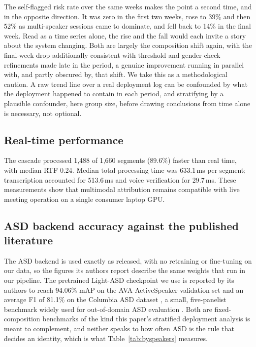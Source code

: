 \documentclass[conference]{IEEEtran}
\begin{document}
The self-flagged risk rate over the same weeks makes the point a
second time, and in the opposite direction. It was zero in the first
two weeks, rose to 39\% and then 52\% as multi-speaker sessions came to
dominate, and fell back to 14\% in the final week. Read as a time
series alone, the rise and the fall would each invite a story about the
system changing. Both are largely the composition shift again, with the
final-week drop additionally consistent with threshold and gender-check
refinements made late in the period, a genuine improvement running in
parallel with, and partly obscured by, that shift. We take this as a
methodological caution. A raw trend line
over a real deployment log can be confounded by what the deployment
happened to contain in each period, and stratifying by a plausible
confounder, here group size, before drawing conclusions from time alone
is necessary, not optional.

\subsection{Real-time performance}

The cascade processed 1{,}488 of 1{,}660 segments (89.6\%) faster than
real time, with median RTF 0.24. Median total processing time was
633.1\,ms per segment; transcription accounted for 513.6\,ms and voice
verification for 29.7\,ms. These measurements show that multimodal
attribution remains compatible with live meeting operation on a single
consumer laptop GPU.

\subsection{ASD backend accuracy against the published literature}
\label{sec:columbia}

The ASD backend is used exactly as released, with no retraining or
fine-tuning on our data, so the figures its authors report describe the
same weights that run in our pipeline. The pretrained Light-ASD
checkpoint we use is reported by its authors to
reach 94.06\% mAP on the AVA-ActiveSpeaker validation set and an
average F1 of 81.1\% on the Columbia ASD dataset
\cite{chakravarty2016columbia}, a small, five-panelist benchmark widely
used for out-of-domain ASD evaluation \cite{liao2023lightasd}. Both are
fixed-composition benchmarks of the kind this paper's stratified
deployment analysis is meant to complement, and neither speaks to how
often ASD is the rule that decides an identity, which is what
Table~\ref{tab:byspeakers} measures.
\end{document}

